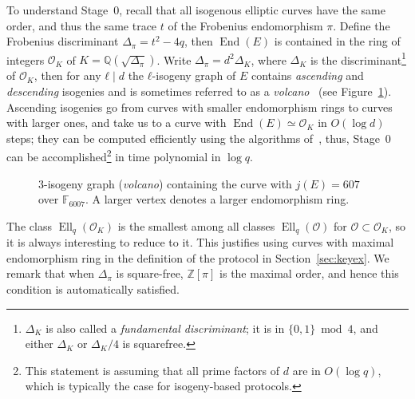 \documentclass{article}
\newcommand{\F}{\mathbb{F}}
\renewcommand{\O}{\mathcal{O}}
\theoremstyle{definition}
\DeclareMathOperator{\End}{End}
\DeclareMathOperator{\Ell}{Ell}
\begin{document}
To understand Stage~0, recall that all isogenous elliptic curves have
the same order, and thus the same trace $t$ of the Frobenius
endomorphism $π$. Define the Frobenius discriminant $Δ_π=t^2-4q$, then
$\End(E)$ is contained in the ring of integers $\O_K$ of
$K=ℚ(\sqrt{Δ_π})$. Write $Δ_π=d^2Δ_K$, where $Δ_K$ is the
discriminant\footnote{$Δ_K$ is also called a \emph{fundamental
    discriminant}; it is in $\{0,1\}\bmod 4$, and either $Δ_K$ or
  $Δ_K/4$ is squarefree.} of $\O_K$, then for any $ℓ\mid d$ the
$ℓ$-isogeny graph of $E$ contains \emph{ascending} and
\emph{descending} isogenies and is sometimes referred to as a
\emph{volcano}~\cite{fouquet+morain02} (see Figure~\ref{fig:volcano}).
Ascending isogenies go from curves with smaller endomorphism rings to
curves with larger ones, and take us to a curve with $\End(E)≃\O_K$ in
$O(\log d)$ steps; they can be computed efficiently using the
algorithms
of~\cite{kohel,fouquet+morain02,ionica+joux13,defeo2016explicit},
thus, Stage~0 can be accomplished\footnote{This statement is assuming
  that all prime factors of $d$ are in $O(\log q)$, which is typically
  the case for isogeny-based protocols.}  in time polynomial in
$\log q$.

\begin{figure}
  \centering
  \caption{$3$-isogeny graph (\emph{volcano}) containing the curve
    with $j(E)=607$ over $\F_{6007}$. A larger vertex denotes a larger
    endomorphism ring.}
  \label{fig:volcano}
\end{figure}

The class $\Ell_q(\O_K)$ is the smallest among all classes
$\Ell_q(\O)$ for $\O⊂\O_K$, so it is always interesting to
reduce to it. This justifies using curves with maximal endomorphism
ring in the definition of the protocol in
Section~\ref{sec:keyex}. We remark that when $Δ_π$ is square-free, $ℤ[π]$
is the maximal order, and hence this condition is automatically satisfied.
\end{document}
